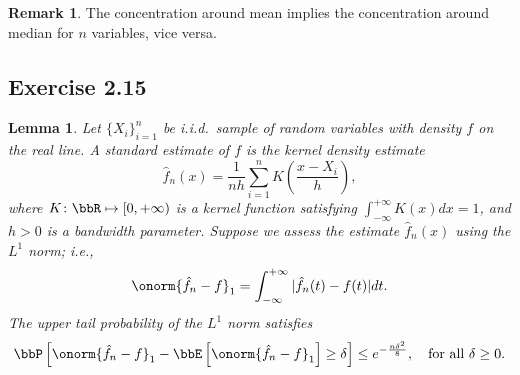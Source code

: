 \documentclass[11pt]{article}
\newcommand{\of}[1]{\left(#1\right)}
\newcommand{\off}[1]{\left[#1\right]}
\theoremstyle{plain}
\newtheorem{lem}{Lemma}
\theoremstyle{definition}
\newtheorem{rmk}{Remark}
\begin{document}
	\begin{rmk}
		The concentration around mean implies the concentration around median for $n$ variables, vice versa. 
	\end{rmk}
	
	
	\subsection{Exercise 2.15}
	\begin{lem}
		Let $\{X_i\}_{i=1}^n$ be i.i.d.\ sample of random variables with density $f$ on the real line. A standard estimate of $f$ is the kernel density estimate 
		\begin{equation}
			\hat f_n (x) = \frac{1}{nh} \sum_{i=1}^n  K\of{ \frac{x- X_i}{h} },
		\end{equation}
		where $K \colon \bbR \mapsto [0,+\infty )$ is a kernel function satisfying $\int_{-\infty}^{+\infty} K(x) dx = 1$, and $h > 0$ is a bandwidth parameter. Suppose we assess the estimate $\hat f_n (x)$ using the $L^1$ norm; i.e.,
		\[ \onorm{\hat f_n - f}_1 = \int_{-\infty}^{+\infty} |\hat f_n(t) - f(t)|dt. \]
		The upper tail probability of the $L^1$ norm satisfies
		\begin{equation}
			\bbP\off{\onorm{\hat f_n - f}_1 - \bbE \off{\onorm{\hat f_n - f}_1}\geq \delta} \leq e^{-\frac{n\delta^2}{8}},\quad \text{for all } \delta \geq 0.
		\end{equation}
	\end{lem}
	
\end{document}
